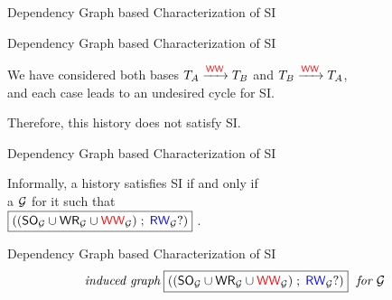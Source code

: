 \begin{frame}{Dependency Graph based Characterization of SI}
	\begin{center}

		\vspace{0.20cm}
		{}
		\vspace{0.20cm}

	\end{center}
\end{frame}

\begin{frame}{Dependency Graph based Characterization of SI}
  \begin{center}
		We have considered both bases $T_{A} \xrightarrow{\textcolor{red}{\textup{\textsf{WW}}}} T_{B}$
		and $T_{B} \xrightarrow{\textcolor{red}{\textup{\textsf{WW}}}} T_{A}$, \\[2pt]
		and each case leads to an undesired cycle for SI.

		\vspace{0.20cm}
		\vspace{0.20cm}

		Therefore, this history does not satisfy SI.
  \end{center}
\end{frame}

\begin{frame}{Dependency Graph based Characterization of SI}
	\begin{theorem}
		Informally, a history satisfies SI if and only if \\[3pt]
		 a  $\mathcal{G}$ for it such that \\[3pt]
		 ${\boxed{((\textup{\textsf{SO}}_{\mathcal{G}} \cup \textup{\textsf{WR}}_{\mathcal{G}} \cup \textcolor{red}{\textup{\textsf{WW}}}_{\mathcal{G}}) \;;\; \textcolor{blue}{\textup{\textsf{RW}}}_{\mathcal{G}}?)}}$ .
	\end{theorem}
\end{frame}

\begin{frame}{Dependency Graph based Characterization of SI}
	\[
		\text{\it induced graph}\; {\boxed{((\textup{\textsf{SO}}_{\mathcal{G}} \cup \textup{\textsf{WR}}_{\mathcal{G}} \cup \textcolor{red}{\textup{\textsf{WW}}}_{\mathcal{G}}) \;;\; \textcolor{blue}{\textup{\textsf{RW}}}_{\mathcal{G}}?)}} \text{\it\; for $\mathcal{G}$}
	\]

	\begin{center}
		\resizebox{0.60\textwidth}{!}{}
		\vspace{0.30cm}


		\vspace{0.20cm}
	\end{center}
\end{frame}

